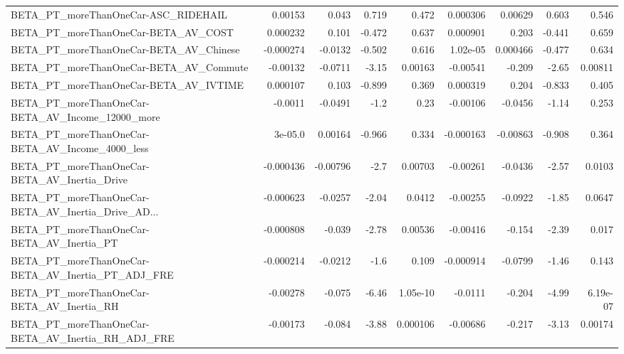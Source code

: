 \begin{tabular}{lrrrrrrrr}
BETA\_PT\_moreThanOneCar-ASC\_RIDEHAIL                &     0.00153 &        0.043 &    0.719 &    0.472 &   0.000306 &     0.00629 &        0.603 &         0.546 \\
BETA\_PT\_moreThanOneCar-BETA\_AV\_COST                &    0.000232 &        0.101 &   -0.472 &    0.637 &   0.000901 &       0.203 &       -0.441 &         0.659 \\
BETA\_PT\_moreThanOneCar-BETA\_AV\_Chinese             &   -0.000274 &      -0.0132 &   -0.502 &    0.616 &   1.02e-05 &    0.000466 &       -0.477 &         0.634 \\
BETA\_PT\_moreThanOneCar-BETA\_AV\_Commute             &    -0.00132 &      -0.0711 &    -3.15 &  0.00163 &   -0.00541 &      -0.209 &        -2.65 &       0.00811 \\
BETA\_PT\_moreThanOneCar-BETA\_AV\_IVTIME              &    0.000107 &        0.103 &   -0.899 &    0.369 &   0.000319 &       0.204 &       -0.833 &         0.405 \\
BETA\_PT\_moreThanOneCar-BETA\_AV\_Income\_12000\_more   &     -0.0011 &      -0.0491 &     -1.2 &     0.23 &   -0.00106 &     -0.0456 &        -1.14 &         0.253 \\
BETA\_PT\_moreThanOneCar-BETA\_AV\_Income\_4000\_less    &     3e-05.0 &      0.00164 &   -0.966 &    0.334 &  -0.000163 &    -0.00863 &       -0.908 &         0.364 \\
BETA\_PT\_moreThanOneCar-BETA\_AV\_Inertia\_Drive       &   -0.000436 &     -0.00796 &     -2.7 &  0.00703 &   -0.00261 &     -0.0436 &        -2.57 &        0.0103 \\
BETA\_PT\_moreThanOneCar-BETA\_AV\_Inertia\_Drive\_AD... &   -0.000623 &      -0.0257 &    -2.04 &   0.0412 &   -0.00255 &     -0.0922 &        -1.85 &        0.0647 \\
BETA\_PT\_moreThanOneCar-BETA\_AV\_Inertia\_PT          &   -0.000808 &       -0.039 &    -2.78 &  0.00536 &   -0.00416 &      -0.154 &        -2.39 &         0.017 \\
BETA\_PT\_moreThanOneCar-BETA\_AV\_Inertia\_PT\_ADJ\_FRE  &   -0.000214 &      -0.0212 &     -1.6 &    0.109 &  -0.000914 &     -0.0799 &        -1.46 &         0.143 \\
BETA\_PT\_moreThanOneCar-BETA\_AV\_Inertia\_RH          &    -0.00278 &       -0.075 &    -6.46 & 1.05e-10 &    -0.0111 &      -0.204 &        -4.99 &      6.19e-07 \\
BETA\_PT\_moreThanOneCar-BETA\_AV\_Inertia\_RH\_ADJ\_FRE  &    -0.00173 &       -0.084 &    -3.88 & 0.000106 &   -0.00686 &      -0.217 &        -3.13 &       0.00174 \\

\end{tabular}
